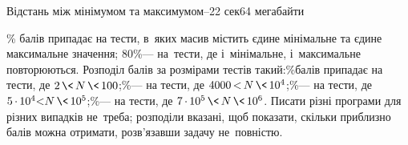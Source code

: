 \begin{problem}{Відстань між мінімумом та максимумом--2}{\stdinOrInputTxt}{\stdoutOrOutputTxt}{2 сек}{64 мегабайти}
\vspace{-0.5\baselineskip}


\% балів припадає на тести, в~яких масив містить єдине мінімальне та єдине максимальне значення; 80\%\nolinebreak[3] --- на~тести, де і~мінімальне, і~максимальне повторюються.
% 
Розподіл балів за розмірами тестів такий:\hspace{1mm plus 1mm}\%\nolinebreak[3] балів припадає на тести, де ${2\,{\<}\,N\,{\<}\,100}$;\hspace{1mm plus 1mm}\%\nolinebreak[3]\nolinebreak[3] --- на тести, де ${4000\,{<}\,N\,{\<}\,10^4}$;\hspace{1mm plus 1mm}\%\nolinebreak[3]\nolinebreak[3] --- на тести, де ${5\,{\cdot}\,10^4{<}N\,{\<}\,10^5}$;\hspace{1mm plus 1mm}\%\nolinebreak[3]\nolinebreak[3] --- на тести, де ${7\,{\cdot}\,10^5\,{\<}\,N\,{\<}\,10^6}$.
% 
Писати різні програми для різних випадків не~треба;
розподіли вказані, щоб показати,
скільки приблизно балів можна отримати, розв'язавши задачу не~повністю.


\end{problem}
